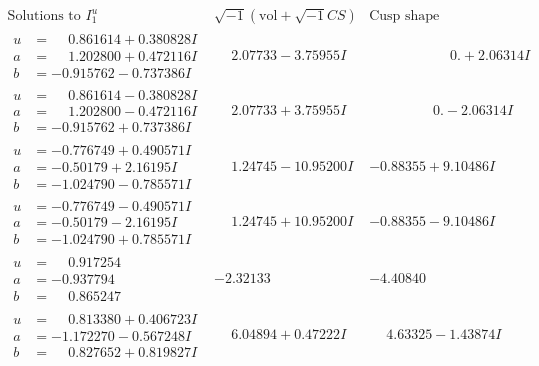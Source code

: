 \documentclass[1p]{elsarticle_modified}
\theoremstyle{definition}
\newcommand{\I}{\sqrt{-1}}
\begin{document}
$$\begin{array}{c|c|c}  
\text{Solutions to }I^u_{1}& \I (\text{vol} + \sqrt{-1}CS) & \text{Cusp shape}\\
 \hline 
\begin{aligned}
u &= \phantom{-}0.861614 + 0.380828 I \\
a &= \phantom{-}1.202800 + 0.472116 I \\
b &= -0.915762 - 0.737386 I\end{aligned}
 & \phantom{-}2.07733 - 3.75955 I & \phantom{-0.000000 -}0. + 2.06314 I \\ \hline\begin{aligned}
u &= \phantom{-}0.861614 - 0.380828 I \\
a &= \phantom{-}1.202800 - 0.472116 I \\
b &= -0.915762 + 0.737386 I\end{aligned}
 & \phantom{-}2.07733 + 3.75955 I & \phantom{-0.000000 } 0. - 2.06314 I \\ \hline\begin{aligned}
u &= -0.776749 + 0.490571 I \\
a &= -0.50179 + 2.16195 I \\
b &= -1.024790 - 0.785571 I\end{aligned}
 & \phantom{-}1.24745 - 10.95200 I & -0.88355 + 9.10486 I \\ \hline\begin{aligned}
u &= -0.776749 - 0.490571 I \\
a &= -0.50179 - 2.16195 I \\
b &= -1.024790 + 0.785571 I\end{aligned}
 & \phantom{-}1.24745 + 10.95200 I & -0.88355 - 9.10486 I \\ \hline\begin{aligned}
u &= \phantom{-}0.917254\phantom{ +0.000000I} \\
a &= -0.937794\phantom{ +0.000000I} \\
b &= \phantom{-}0.865247\phantom{ +0.000000I}\end{aligned}
 & -2.32133\phantom{ +0.000000I} & -4.40840\phantom{ +0.000000I} \\ \hline\begin{aligned}
u &= \phantom{-}0.813380 + 0.406723 I \\
a &= -1.172270 - 0.567248 I \\
b &= \phantom{-}0.827652 + 0.819827 I\end{aligned}
 & \phantom{-}6.04894 + 0.47222 I & \phantom{-}4.63325 - 1.43874 I \\ \hline\begin{aligned}

\end{aligned}
\end{array}$$
\end{document}
